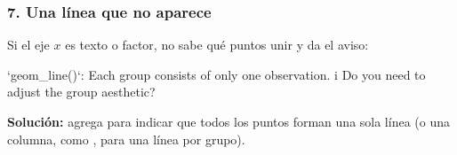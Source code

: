 \subsubsection{7. Una línea que no aparece}

Si el eje $x$ es texto o factor,  no sabe qué puntos
unir y da el aviso:

\begin{rsalida}
`geom_line()`: Each group consists of only one observation.
i Do you need to adjust the group aesthetic?
\end{rsalida}

\textbf{Solución:} agrega  para indicar que todos
los puntos forman una sola línea (o una columna, como , para una línea por grupo).

